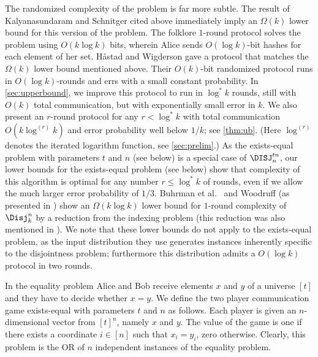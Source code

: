 The randomized complexity of the problem is far more subtle. The
result of Kalyanasundaram and Schnitger cited above immediately 
imply an $\Omega(k)$ lower bound for this version of the problem. 
The folklore $1$-round protocol
solves the problem using $O(k\log k)$ bits, wherein Alice sends
$O(\log k)$-bit hashes for each element of her set. Håstad and
Wigderson \cite{HastadW2007} gave a protocol that matches the
$\Omega(k)$ lower bound mentioned above. Their $O(k)$-bit
randomized protocol runs in $O(\log k)$-rounds and errs with a
small constant probability. In \autoref{sec:upperbound}, we
improve this protocol to run in $\log^*k$ rounds, still with
$O(k)$ total communication, but with exponentially small error
in $k$. We also present an $r$-round protocol for any
$r<\log^*k$ with total communication $O(k\log^{(r)}k)$ and error
probability well below $1/k$; see \autoref{thm:ub}. (Here
$\log^{(r)}$ denotes the iterated logarithm function, see
\autoref{sec:prelim}.) As the exists-equal problem with parameters
$t$ and $n$ (see below) is a special case of $\DISJ_n^{tn}$, our
lower bounds for the exists-equal problem (see below) show that
complexity of this algorithm is optimal for any number
$r\le\log^*k$ of rounds, even if we allow the much larger error
probability of $1/3$. Buhrman et al.~\cite{BuhrmanGMW2012} and
Woodruff \cite{Woodruff2008} (as presented in \cite{Patrascu2009})
show an $\Omega(k\log k)$ lower bound for $1$-round complexity
of $\Disj^n_k$ by a reduction from the indexing problem (this 
reduction was also mentioned in \cite{DasguptaKS12}). We
note that these lower bounds do not apply to the exists-equal
problem, as the input distribution they use generates instances
inherently specific to the disjointness problem; furthermore
this distribution admits a $O(\log k)$ protocol in two rounds.

In the equality problem Alice and Bob receive elements $x$ and
$y$ of a universe $[t]$ and they have to decide whether $x=y$.
We define the two player communication game exists-equal with
parameters $t$ and $n$ as follows. Each player is given an
$n$-dimensional vector from $[t]^n$, namely $x$ and $y$. The
value of the game is one if there exists a coordinate $i\in[n]$
such that $x_i = y_i$, zero otherwise. Clearly, this problem is
the OR of $n$ independent instances of the equality problem.

